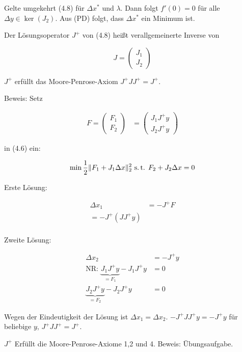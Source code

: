 Gelte umgekehrt (4.8) für $\Delta x^*$ und $\lambda$. Dann folgt $f'(0) = 0$ für alle $\Delta y \in \ker(J_2)$. Aus (PD) folgt, dass $\Delta x^*$ ein Minimum ist.


Der Lösungsoperator $J^+$ von (4.8) heißt verallgemeinerte Inverse von

\[ J = \begin{pmatrix} J_1 \\ J_2 \end{pmatrix} \]


$J^+$ erfüllt das Moore-Penrose-Axiom $J^+ J J^+ = J^+$.

Beweis: Setz

\begin{align*}
F = \begin{pmatrix} F_1 \\ F_2 \end{pmatrix} &= \begin{pmatrix} J_1 J^+ y \\ J_2 J^+ y \end{pmatrix}
\end{align*}

in (4.6) ein:

\[ \min \frac 12 \| F_1 + J_1 \Delta x\|_2^2 \text{ s.\,t. } F_2+ J_2 \Delta x = 0 \]

Erste Lösung:

\begin{align*}
\Delta x_1 &= - J^+ F \\
= - J^+ (J J^+ y) \\
\end{align*}

Zweite Lösung:

\begin{align*}
\Delta x_2 &= - J^+ y\\
\text{NR: } \underbrace{J_1 J^+ y}_{=F_1} - J_1 J^+ y &= 0 \\
\underbrace{J_2 J^+ y}_{=F_2} - J_2 J^+ y &= 0
\end{align*}

Wegen der Eindeutigkeit der Lösung ist $\Delta x_1 = \Delta x_2$. $-J^+ J J^+ y = -J^+y$ für beliebige $y$, $J^+ J J^+ = J^+$.


$J^+$ Erfüllt die Moore-Penrose-Axiome 1,2 und 4. Beweis: Übungsaufgabe.

